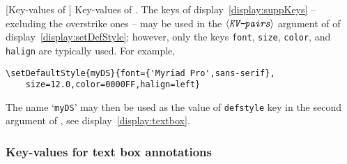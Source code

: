 \documentclass[12pt]{article}
\makeatletter
\let\opt\texttt
\def\ameta#1{$\langle\textit{\texttt{#1}}\rangle$}
\let\amtIndent\leftmargini
\renewcommand*{\theparagraph}{\texorpdfstring{\protect\P\protect\ }{\textparagraph}}
\renewcommand{\paragraph}
    {\renewcommand{\@seccntformat}[1]{\theparagraph}%
    \@startsection{paragraph}{4}{0pt}{6pt}{-3pt}{\color{\aeb@subsubsectioncolor}\bfseries}}
\makeatother
\begin{document}
\paragraph[Key-values of \texorpdfstring{\protect{}}{\textbackslash{setDefaultStyle}}]%
{Key-values of .}\label{para:KeysDS} The
keys of display~\eqref{display:suppKeys} -- excluding the overstrike ones --
may be used in the \ameta{KV-pairs} argument of  of
display~\eqref{display:setDefStyle}; however, only the keys \opt{font},
\opt{size}, \opt{color}, and \opt{halign} are typically used. For example,
\begin{Verbatim}[xleftmargin=\amtIndent,fontsize=\small,commandchars=!()]
\setDefaultStyle{myDS}{font={'Myriad Pro',sans-serif},
    size=12.0,color=0000FF,halign=left}
\end{Verbatim}
The name `\opt{myDS}' may then be used as the value of \opt{defstyle} key in the second argument
of , see display~\eqref{display:textbox}.

\subsubsection{Key-values for text box annotations}
\end{document}
